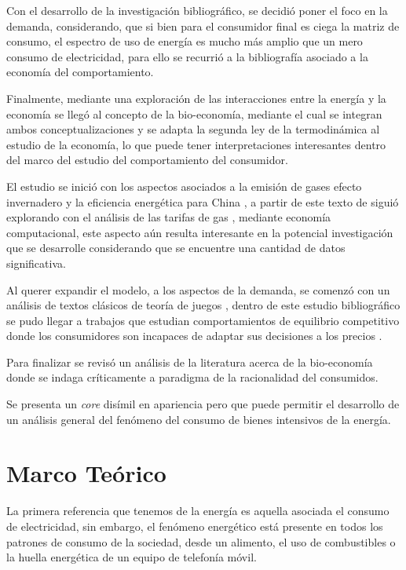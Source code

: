 \documentclass{article}
\begin{document}
Con el desarrollo de la investigación bibliográfico, se decidió poner el foco en la demanda, considerando, que si bien para el consumidor final es ciega la matriz de consumo, el espectro de uso de energía es mucho más amplio que un mero consumo de electricidad, para ello se recurrió a la bibliografía asociado a la economía del comportamiento.

Finalmente, mediante una exploración de las interacciones entre la energía y la economía se llegó al concepto de la bio-economía, mediante el cual se integran ambos conceptualizaciones y se adapta la segunda ley de la termodinámica al estudio de la economía, lo que puede tener interpretaciones interesantes dentro del marco del estudio del comportamiento del consumidor.

El estudio se inició con los aspectos asociados a la emisión de gases efecto invernadero y la eficiencia energética para China \cite{li_metafroniter_2015}, a partir de este texto de siguió explorando con el análisis de las tarifas de gas \cite{gong_evaluating_2016}, mediante economía computacional, este aspecto aún resulta interesante en la potencial investigación que se desarrolle considerando que se encuentre una cantidad de datos significativa.

Al querer expandir el modelo, a los aspectos de la demanda, se comenzó con un análisis de textos clásicos de teoría de juegos \cite{osborne_course_1994}, dentro de este estudio bibliográfico se pudo llegar a trabajos que estudian comportamientos de equilibrio competitivo donde los consumidores son incapaces de adaptar sus decisiones a los precios \cite{gul_coarse_2017}.

Para finalizar se revisó un análisis de la literatura \cite{maneschi_nicholas_2020} acerca de la bio-economía donde se indaga críticamente a paradigma de la racionalidad del consumidos.

Se presenta un \textit{core} disímil en apariencia pero que puede permitir el desarrollo de un análisis general del fenómeno del consumo de bienes intensivos de la energía.

\section{Marco Teórico}

La primera referencia que tenemos de la energía es aquella asociada el consumo de electricidad, sin embargo, el fenómeno energético está presente en todos los patrones de consumo de la sociedad, desde un alimento, el uso de combustibles o la huella energética de un equipo de telefonía móvil.
\end{document}
